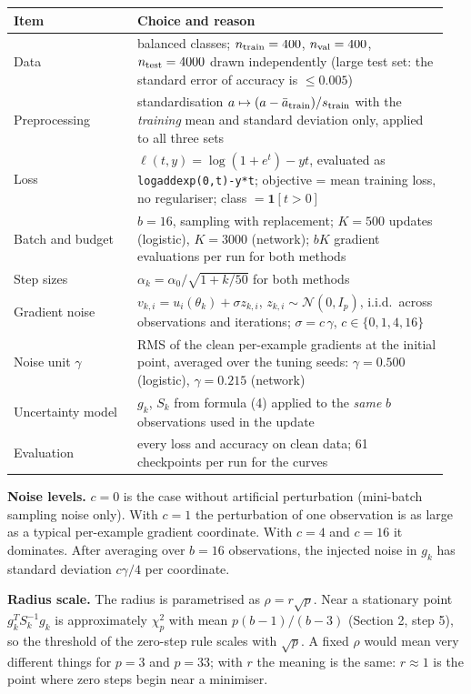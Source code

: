 \documentclass[11pt,a4paper]{article}
\begin{document}
\begin{center}
\small
\begin{tabular}{@{}p{0.27\linewidth}p{0.68\linewidth}@{}}
\toprule
Item & Choice and reason \\
\midrule
Data & balanced classes; $n_{\rm train}=400$, $n_{\rm val}=400$, $n_{\rm test}=4000$ drawn
independently (large test set: the standard error of accuracy is $\le0.005$) \\
Preprocessing & standardisation $a\mapsto(a-\bar a_{\rm train})/s_{\rm train}$ with the
\emph{training} mean and standard deviation only, applied to all three sets \\
Loss & $\ell(t,y)=\log(1+e^t)-yt$, evaluated as \texttt{logaddexp(0,t)-y*t}; objective = mean
training loss, no regulariser; class $=\mathbf 1[t>0]$ \\
Batch and budget & $b=16$, sampling with replacement; $K=500$ updates (logistic), $K=3000$
(network); $bK$ gradient evaluations per run for both methods \\
Step sizes & $\alpha_k=\alpha_0/\sqrt{1+k/50}$ for both methods \\
Gradient noise & $v_{k,i}=u_i(\theta_k)+\sigma z_{k,i}$, $z_{k,i}\sim\mathcal N(0,I_p)$, i.i.d.\
across observations and iterations; $\sigma=c\,\gamma$, $c\in\{0,1,4,16\}$ \\
Noise unit $\gamma$ & RMS of the clean per-example gradients at the initial point, averaged
over the tuning seeds: $\gamma=0.500$ (logistic), $\gamma=0.215$ (network) \\
Uncertainty model & $g_k$, $S_k$ from formula (4) applied to the \emph{same} $b$ observations
used in the update \\
Evaluation & every loss and accuracy on clean data; 61 checkpoints per run for the curves \\
\bottomrule
\end{tabular}
\end{center}

\textbf{Noise levels.} $c=0$ is the case without artificial perturbation (mini-batch sampling
noise only). With $c=1$ the perturbation of one observation is as large as a typical
per-example gradient coordinate. With $c=4$ and $c=16$ it dominates. After averaging over
$b=16$ observations, the injected noise in $g_k$ has standard deviation $c\gamma/4$ per
coordinate.

\textbf{Radius scale.} The radius is parametrised as $\rho=r\sqrt p$. Near a stationary
point $g_k^TS_k^{-1}g_k$ is approximately $\chi^2_p$ with mean $p(b-1)/(b-3)$ (Section 2,
step 5), so the threshold of the zero-step rule scales with $\sqrt p$. A fixed $\rho$ would mean
very different things for $p=3$ and $p=33$; with $r$ the meaning is the same: $r\approx1$ is
the point where zero steps begin near a minimiser.
\end{document}

